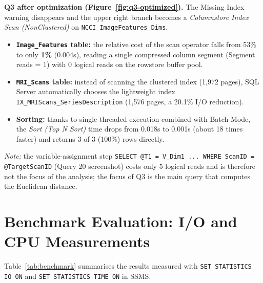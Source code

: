 \textbf{Q3 after optimization (Figure~\ref{fig:q3-optimized}).} The Missing Index warning disappears and the upper right branch becomes a \textit{Columnstore Index Scan (NonClustered)} on \texttt{NCCI\_ImageFeatures\_Dims}.
\begin{itemize}
  \item \textbf{\texttt{Image\_Features} table:} the relative cost of the scan operator falls from 53\% to only \textbf{1\%} (0.004s), reading a single compressed column segment (Segment reads = 1) with 0 logical reads on the rowstore buffer pool.
  \item \textbf{\texttt{MRI\_Scans} table:} instead of scanning the clustered index (1,972 pages), SQL Server automatically chooses the lightweight index \texttt{IX\_MRIScans\_SeriesDescription} (1,576 pages, a 20.1\% I/O reduction).
  \item \textbf{Sorting:} thanks to single-threaded execution combined with Batch Mode, the \textit{Sort (Top N Sort)} time drops from 0.018s to 0.001s (about 18 times faster) and returns 3 of 3 (100\%) rows directly.
\end{itemize}

\textit{Note:} the variable-assignment step \texttt{SELECT @T1 = V\_Dim1 ... WHERE ScanID = @TargetScanID} (Query 20 screenshot) costs only 5 logical reads and is therefore not the focus of the analysis; the focus of Q3 is the main query that computes the Euclidean distance.

\section{Benchmark Evaluation: I/O and CPU Measurements}
\label{sec:benchmark}

Table~\ref{tab:benchmark} summarises the results measured with \texttt{SET STATISTICS IO ON} and \texttt{SET STATISTICS TIME ON} in SSMS.

